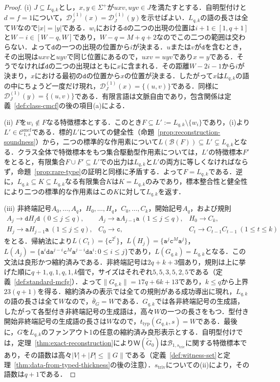 \documentclass[11pt,a4paper]{ltjsarticle}
\numberwithin{equation}{section}
\theoremstyle{plain}
\theoremstyle{definition}
\theoremstyle{remark}
\newcommand{\Wit}{\mathsf{W}}
\newcommand{\Cmcf}[2]{\mathcal{C}^{\mathrm{mcf}}_{#1,#2}}
\newcommand{\D}{\mathcal{D}}
\begin{document}
\begin{proof}
(i) $J\subseteq L_{q,k}$とし，$x,y\in\Sigma^+$が$uxv,uyv\in J$を満たすとする．自明型付けと$d=f=1$について，$\D_J^{(1)}(x)=\D_J^{(1)}(y)$を示せばよい．$L_{q,k}$の語の長さは全て$W$なので$|x|=|y|$である．$w_i$における$\mathtt d$の二つの出現の位置は$i+1\in[1,q+1]$と$W-i\in[W-q,W]$であり，$W-q=M+q+2$なのでこの二つの範囲は交わらない．よって$\mathtt d$の一つの出現の位置から$i$が決まる．$u$または$v$が$\mathtt d$を含むとき，その出現は$uxv$と$uyv$で同じ位置にあるので，$uxv=uyv$であり$x=y$である．そうでなければ$\mathtt d$の二つの出現はともに$x$に含まれる．その距離$W-2i-1$から$i$が決まり，$x$における最初の$\mathtt d$の位置から$x$の位置が決まる．したがって$x$は$L_{q,k}$の語の中にちょうど一度だけ現れ，$\D_J^{(1)}(x)=\{(u,v)\}$である．同様に$\D_J^{(1)}(y)=\{(u,v)\}$である．有限言語は文脈自由であり，包含関係は定義~\ref{def:class-cmcf}の後の項目(a)による．

(ii) $F$を$w_i\notin F$なる特徴標本とする．このとき$F\subseteq L':=L_{q,k}\setminus\{w_i\}$であり，(i)より$L'\in\Cmcf{1}{s}$である．標的$L'$についての健全性（命題~\ref{prop:reconstruction-soundness}）から，二つの標準的な作用素について$L(\mathcal B(F))\subseteq L'\subsetneq L_{q,k}$となる．クラス全体で特徴標本をもつ集合駆動型作用素については，$L'$の特徴標本$F'$をとると，有限集合$F\cup F'\subseteq L'$での出力は$L_{q,k}$と$L'$の両方に等しくなければならず，命題~\ref{prop:rare-type}の証明と同様に矛盾する．よって$F=L_{q,k}$である．逆に，$L_{q,k}\subseteq K\subseteq L_{q,k}$なる有限集合$K$は$K=L_{q,k}$のみであり，標本整合性と健全性により二つの標準的な作用素はこの$K$に対して$L_{q,k}$を返す．

(iii) 非終端記号$A_0,\ldots,A_q$，$H_0,\ldots,H_q$，$C_0,\ldots,C_k$，開始記号$A_q$，および規則
\[
\begin{array}{lll}
 A_j\to\mathtt d H_j\mathtt d\ (0\le j\le q), &
 A_j\to\mathtt a A_{j-1}\mathtt a\ (1\le j\le q), &
 H_0\to C_k,\\
 H_j\to\mathtt a H_{j-1}\mathtt a\ (1\le j\le q), &
 C_0\to\mathtt c, &
 C_t\to C_{t-1}C_{t-1}\ (1\le t\le k)
\end{array}
\]
をとる．帰納法により$L(C_t)=\{\mathtt c^{2^t}\}$，$L(H_j)=\{\mathtt a^j\mathtt c^M\mathtt a^j\}$，$L(A_j)=\{\mathtt a^i\mathtt d\mathtt a^{j-i}\mathtt c^M\mathtt a^{j-i}\mathtt d\mathtt a^i:0\le i\le j\}$であり，$L(G_{q,k})=L_{q,k}$となる．この文法は良形かつ縮約済みである．非終端記号は$2q+k+3$個あり，規則は上に挙げた順に$q+1,q,1,q,1,k$個で，サイズはそれぞれ$5,5,3,5,2,5$である（定義~\ref{def:standard-mcfg}）．よって$\|G_{q,k}\|=17q+6k+13$であり，$k\le q$から上界$23(q+1)$を得る．縮約済みの表示では全ての規則がある成功導出に現れ，$L_{q,k}$の語の長さは全て$W$なので，$\bar\theta_G=W$である．$G_{q,k}$では各非終端記号の生成語，したがって各型付き非終端記号の生成語は，高々$W$の一つの長さをもつ．型付き開始非終端記号の生成語の長さは$W$なので，$t_{\mathrm{typ}}(G_{q,k},s)=W$である．最後に，$G$を$L_{q,k}$のファンアウト1の任意の縮約済み良形表示とする．自明型付けでは，定理~\ref{thm:exact-reconstruction}により$\Wit(\widetilde G_0)$は$\mathcal B_{1,s_{\mathrm{triv}}}$に関する特徴標本であり，その語数は高々$|V|+|P|\le\|G\|$である（定義~\ref{def:witness-set}と定理~\ref{thm:data-from-typed-thickness}の後の注意）．$s_{\mathrm{triv}}$についての(ii)により，その語数は$q+1$である．


\end{proof}
\end{document}
